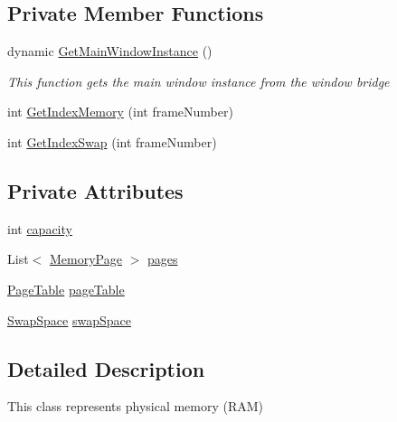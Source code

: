 \subsection*{Private Member Functions}
\begin{DoxyCompactItemize}
\item 
dynamic \hyperlink{class_c_p_u___o_s___simulator_1_1_memory_1_1_physical_memory_a78a9b68e70b5f44ac1d38fc653b51724}{Get\+Main\+Window\+Instance} ()
\begin{DoxyCompactList}\small\item\em This function gets the main window instance from the window bridge \end{DoxyCompactList}\item 
int \hyperlink{class_c_p_u___o_s___simulator_1_1_memory_1_1_physical_memory_aa37a178a2a3114c4377b9458ae47bbbc}{Get\+Index\+Memory} (int frame\+Number)
\item 
int \hyperlink{class_c_p_u___o_s___simulator_1_1_memory_1_1_physical_memory_a8497f98d7f88ca1ba466c911e0086c81}{Get\+Index\+Swap} (int frame\+Number)
\end{DoxyCompactItemize}
\subsection*{Private Attributes}
\begin{DoxyCompactItemize}
\item 
int \hyperlink{class_c_p_u___o_s___simulator_1_1_memory_1_1_physical_memory_aefbb5641a06c37aa17bb523d8c90dc60}{capacity}
\item 
List$<$ \hyperlink{class_c_p_u___o_s___simulator_1_1_memory_1_1_memory_page}{Memory\+Page} $>$ \hyperlink{class_c_p_u___o_s___simulator_1_1_memory_1_1_physical_memory_aaf32bdc314ba84ea7e120fb28e3a3e67}{pages}
\item 
\hyperlink{class_c_p_u___o_s___simulator_1_1_memory_1_1_page_table}{Page\+Table} \hyperlink{class_c_p_u___o_s___simulator_1_1_memory_1_1_physical_memory_a7812a37c95af296758ed7814a95a3ea3}{page\+Table}
\item 
\hyperlink{class_c_p_u___o_s___simulator_1_1_memory_1_1_swap_space}{Swap\+Space} \hyperlink{class_c_p_u___o_s___simulator_1_1_memory_1_1_physical_memory_a0dedf020af5760e7c9875e4bcc9f5990}{swap\+Space}
\end{DoxyCompactItemize}


\subsection{Detailed Description}
This class represents physical memory (R\+A\+M) 



